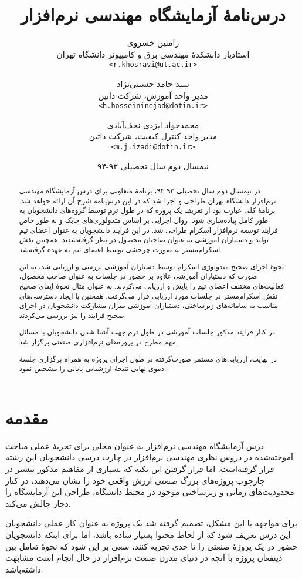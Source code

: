\documentclass[a4paper,notitlepage]{report}
\title{درس‌نامهٔ آزمایشگاه مهندسی نرم‌افزار}
\author{
رامتین خسروی\\\small{استادیار دانشکدهٔ مهندسی برق و کامپیوتر دانشگاه تهران}\\
\small\texttt{<r.khosravi@ut.ac.ir>}\and
سید حامد حسینی‌نژاد\\\small{مدیر واحد آموزش، شرکت داتین}\\
\small\texttt{<h.hosseininejad@dotin.ir>}\and
محمدجواد ایزدی نجف‌آبادی\\\small{مدیر واحد کنترل کیفیت، شرکت داتین}\\
\small\texttt{<m.j.izadi@dotin.ir>}
}
\date{نیمسال دوم سال تحصیلی ۹۳-۹۴}
\begin{document}
\maketitle
\tableofcontents
\newpage

\begin{abstract}
در نیمسال دوم سال تحصیلی ۹۳-۹۴، برنامهٔ متفاوتی برای درس آزمایشگاه مهندسی نرم‌افزار دانشگاه تهران طراحی و اجرا شد
که در این درس‌نامه شرح آن ارائه خواهد شد.
برنامهٔ کلی عبارت بود از تعریف یک پروژه که در طول ترم توسط گروه‌های دانشجویان به طور کامل پیاده‌سازی شود.
روال اجرایی بر اساس متدولوژی‌های چابک و به طور خاص فرایند توسعه نرم‌افزار اسکرام طراحی شد.
در این فرایند دانشجویان به عنوان اعضای تیم تولید و دستیاران آموزشی به عنوان صاحبان محصول در نظر گرفته‌شدند.
همچنین نقش اسکرام‌مستر به صورت چرخشی توسط اعضای تیم به عهده گرفته‌شد.

نحوهٔ اجرای صحیح متدولوژی اسکرام توسط دسیاران آموزشی بررسی و ارزیابی شد،
به این صورت که دستیاران آموزشی علاوه بر حضور در جلسات به عنوان صاحب محصول، فعالیت‌های مختلف اعضای تیم را پایش و ارزیابی می‌کردند.
به عنوان مثال نحوهٔ ایفای صحیح نقش اسکرام‌مستر در جلسات مورد ارزیابی قرار می‌گرفت.
همچنین با ایجاد دسترسی‌های مناسب به سامانه‌های زیرساختی، دستیاران آموزشی میزان مشارکت دانشجویان در اجرای صحیح فرایند را نیز بررسی می‌کردند.

در کنار فرایند مذکور جلسات آموزشی در طول ترم جهت آشنا شدن دانشجویان با مسائل مهم مطرح در پروژه‌های نرم‌افزاری صنعتی برگزار شد.

در نهایت، ارزیابی‌های مستمر صورت‌گرفته در طول اجرای پروژه به همراه برگزاری جلسهٔ دموی نهایی نتیجهٔ ارزشیابی پایانی را مشخص نمود.
\end{abstract}
\chapter{مقدمه}
درس آزمایشگاه مهندسی نرم‌افزار به عنوان محلی برای تجربهٔ عملی مباحث آموخته‌شده در دروس نظری مهندسی نرم‌افزار در چارت درسی دانشجویان این رشته قرار گرفته‌است.
اما قرار گرفتن این نکته که بسیاری از مفاهیم مذکور بیشتر در چارچوب پروژه‌های بزرگ صنعتی ارزش واقعی خود را نشان می‌دهند، 
در کنار محدودیت‌های زمانی و زیرساختی موجود در محیط دانشگاه، طراحی این آزمایشگاه را دچار چالش می‌کند.

برای مواجهه با این مشکل، تصمیم گرفته شد یک پروژه به عنوان کار عملی دانشجویان این درس تعریف شود که از لحاظ محتوا بسیار ساده باشد،
اما برای اینکه  دانشجویان حضور در یک پروژهٔ صنعتی را تا حدی تجربه کنند، سعی بر این شود که نحوهٔ تعامل بین ذینفعان پروژه
با آنچه در دنیای مدرن صنعت نرم‌افزار در حال انجام است مشابهت داشته‌باشد.
\end{document}
